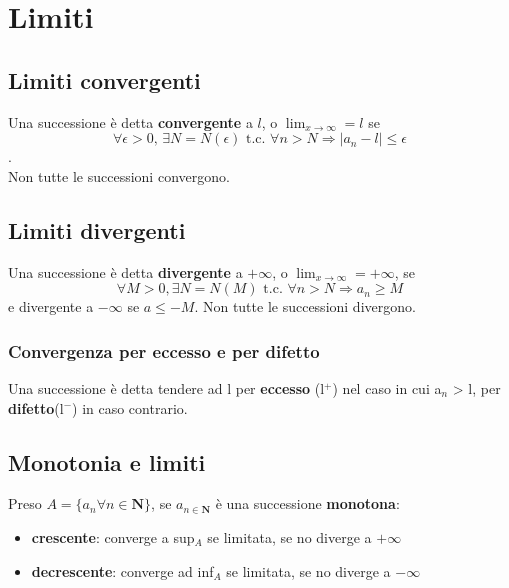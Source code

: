 \documentclass{report}
\begin{document}
\section{Limiti}
    \subsection{Limiti convergenti}
        Una successione è detta \textbf{convergente} a $l$, o $\lim_{x \to \infty} = l$ se 
        $$\forall\epsilon > 0,\, \exists N = N\left(\epsilon\right) \textrm{ t.c. } \forall n > N \Longrightarrow
        |a_n - l| \leq \epsilon$$. \\
        Non tutte le successioni convergono.
    \subsection{Limiti divergenti}
        Una successione è detta \textbf{divergente} a $+\infty$, o 
        $\lim_{x \to \infty} = +\infty$, se $$\forall M > 0, \exists N = N\left(M\right)
        \textrm{ t.c. } \forall n > N \Longrightarrow a_n \geq M$$ e divergente a 
        $-\infty$ se $a \leq -M$.
        Non tutte le successioni divergono.
        \subsubsection{Convergenza per eccesso e per difetto}
            Una successione è detta tendere ad l per \textbf{eccesso} (l$^+$) nel caso 
            in cui a$_n$ > l, per \textbf{difetto}(l$^-$) in caso contrario.
            
    \subsection{Monotonia e limiti}
        Preso $A = \{a_n \forall n \in \mathbf{N}\}$, se $a_{n \in \mathbf{N}}$ è una successione \textbf{monotona}:
        \begin{itemize}
            \item \textbf{crescente}: converge a sup$_A$ se limitata, se no diverge a $+\infty$
            \item \textbf{decrescente}: converge ad inf$_A$ se limitata, se no diverge a $-\infty$
        \end{itemize}
\end{document}
